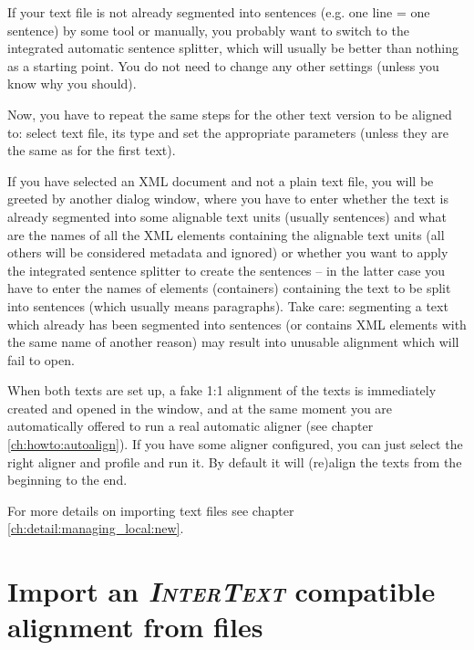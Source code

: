 \documentclass[a4paper,10pt,oneside]{book}
\newcommand{\IT}{\textit{\textsc{InterText}}\xspace}
\begin{document}
If your text file is not already segmented into sentences (e.g. one line = one sentence) by some tool or manually, you probably want to switch to the integrated automatic sentence splitter, which will usually be better than nothing as a starting point. You do not need to change any other settings (unless you know why you should).


Now, you have to repeat the same steps for the other text version to be aligned to: select text file, its type and set the appropriate parameters (unless they are the same as for the first text).

If you have selected an XML document and not a plain text file, you will be greeted by another dialog window, where you have to enter whether the text is already segmented into some alignable text units (usually sentences) and what are the names of all the XML elements containing the alignable text units (all others will be considered metadata and ignored) or whether you want to apply the integrated sentence splitter to create the sentences -- in the latter case you have to enter the names of elements (containers) containing the text to be split into sentences (which usually means paragraphs). Take care: segmenting a text which already has been segmented into sentences (or contains XML elements with the same name of another reason) may result into unusable alignment which will fail to open.

When both texts are set up, a fake 1:1 alignment of the texts is immediately created and opened in the window, and at the same moment you are automatically offered to run a real automatic aligner (see chapter \ref{ch:howto:autoalign}). If you have some aligner configured, you can just select the right aligner and profile and run it. By default it will (re)align the texts from the beginning to the end.

For more details on importing text files see chapter \ref{ch:detail:managing_local:new}.

\section{Import an \IT compatible alignment from files}\label{ch:howto:importfromxml}
\end{document}
